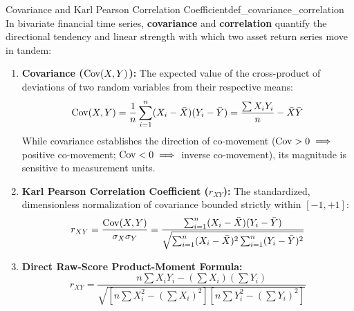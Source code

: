 \begin{definition}{Covariance and Karl Pearson Correlation Coefficient}{def_covariance_correlation}
In bivariate financial time series, \textbf{covariance} and \textbf{correlation} quantify the directional tendency and linear strength with which two asset return series move in tandem:
\begin{enumerate}[leftmargin=*, topsep=2pt, itemsep=3pt]
    \item \textbf{Covariance ($\operatorname{Cov}(X, Y)$):} The expected value of the cross-product of deviations of two random variables from their respective means:
    \begin{equation}
        \operatorname{Cov}(X, Y) = \frac{1}{n}\sum_{i=1}^{n} (X_i - \bar{X})(Y_i - \bar{Y}) = \frac{\sum X_i Y_i}{n} - \bar{X}\bar{Y}
    \end{equation}
    While covariance establishes the direction of co-movement ($\operatorname{Cov} > 0 \implies$ positive co-movement; $\operatorname{Cov} < 0 \implies$ inverse co-movement), its magnitude is sensitive to measurement units.

    \item \textbf{Karl Pearson Correlation Coefficient ($r_{XY}$):} The standardized, dimensionless normalization of covariance bounded strictly within $[-1, +1]$:
    \begin{equation}
        r_{XY} = \frac{\operatorname{Cov}(X, Y)}{\sigma_X \sigma_Y} = \frac{\sum_{i=1}^{n} (X_i - \bar{X})(Y_i - \bar{Y})}{\sqrt{\sum_{i=1}^{n} (X_i - \bar{X})^2 \sum_{i=1}^{n} (Y_i - \bar{Y})^2}}
    \end{equation}
    \item \textbf{Direct Raw-Score Product-Moment Formula:}
    \begin{equation}
        r_{XY} = \frac{n \sum X_i Y_i - \left(\sum X_i\right)\left(\sum Y_i\right)}{\sqrt{\left[n \sum X_i^2 - \left(\sum X_i\right)^2\right] \left[n \sum Y_i^2 - \left(\sum Y_i\right)^2\right]}}
    \end{equation}
\end{enumerate}
\end{definition}

